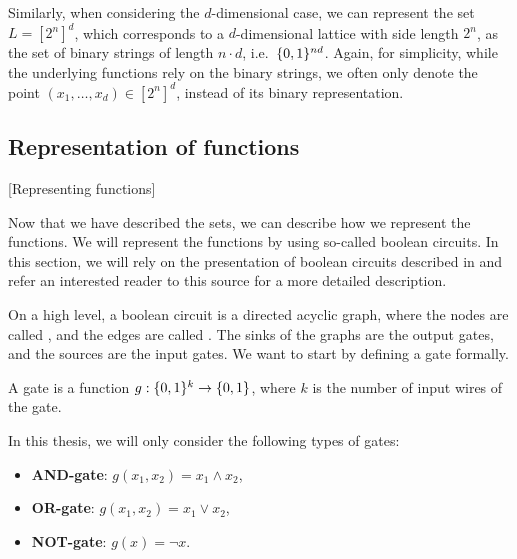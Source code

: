 Similarly, when considering the $d$-dimensional case, we can represent the set $L = [2^n]^d$, which corresponds to a $d$-dimensional lattice with side length $2^n$, as the set of binary strings of length $n \cdot d$, i.e.\ $\{0, 1\}^{nd}$. Again, for simplicity, while the underlying functions rely on the binary strings, we often only denote the point $(x_1, \dots, x_d) \in [2^n]^d$, instead of its binary representation.

\subsection{Representation of functions}[Representing functions]

Now that we have described the sets, we can describe how we represent the functions. We will represent the functions by using so-called boolean circuits. In this section, we will rely on the presentation of boolean circuits described in  and refer an interested reader to this source for a more detailed description.

On a high level, a boolean circuit is a directed acyclic graph, where the nodes are called , and the edges are called . The sinks of the graphs are the output gates, and the sources are the input gates. We want to start by defining a gate formally.

\begin{definition}[Gate]
    A gate is a function $g : \{0, 1\}^k \rightarrow \{0, 1\}$, where $k$ is the number of input wires of the gate.
\end{definition}

In this thesis, we will only consider the following types of gates:
\begin{itemize}
    \item \textbf{AND-gate}: $g(x_1, x_2) = x_1 \land x_2$,
    \item \textbf{OR-gate}: $g(x_1, x_2) = x_1 \lor x_2$,
    \item \textbf{NOT-gate}: $g(x) = \lnot x$.
\end{itemize}

